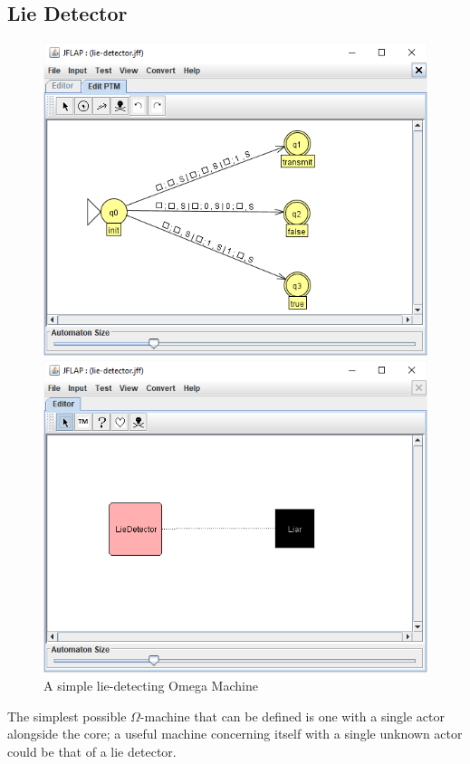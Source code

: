 \documentclass[12pt]{article}
\begin{document}
	\subsection{Lie Detector}
	\begin{figure}
		\includegraphics[width=\linewidth]{scenario-lie-tm}
		\smallskip\par
		\includegraphics[width=\linewidth]{scenario-lie-omega}
		\caption{A simple lie-detecting Omega Machine}
		\label{fig:lie}
	\end{figure}
		The simplest possible $\Omega$-machine that can be defined is one with a single actor alongside the core; a useful machine concerning itself with a single unknown actor could be that of a lie detector.
\end{document}
